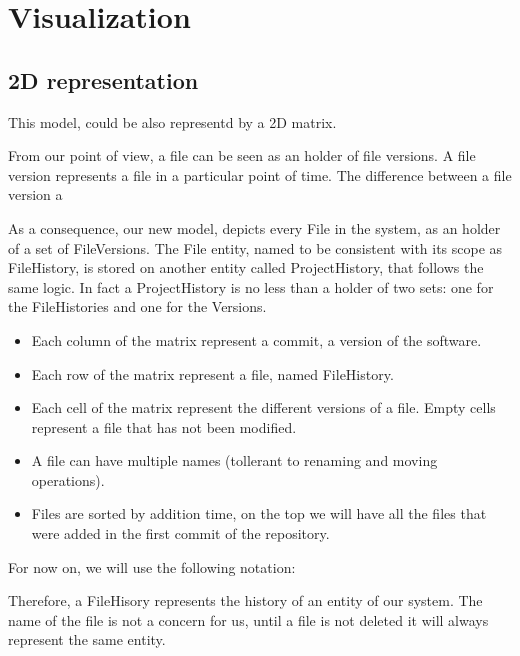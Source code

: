  



\section{Visualization}

\subsection*{2D representation}
This model, could be also representd by a 2D matrix. 


From our point of view, a file can be seen as an holder of file versions.
A file version represents a file in a particular point of time. The difference between a file version a


As a consequence, our new model, depicts every File in the system, as an holder of a set of FileVersions. 
The File entity, named to be consistent with its scope as FileHistory, is stored on another entity called ProjectHistory, that follows the same logic. 
In fact a ProjectHistory is no less than a holder of two sets: one for the FileHistories and one for the Versions. 




\begin{itemize}
    \item Each column of the matrix represent a commit, a version of the software.
    \item Each row of the matrix represent a file, named FileHistory.
    \item Each cell of the matrix represent the different versions of a file. Empty cells represent a file that has not been modified.
    \item A file can have multiple names (tollerant to renaming and moving operations).
    \item Files are sorted by addition time, on the top we will have all the files that were added in the first commit of the repository. 
\end{itemize}

For now on, we will use the following notation:


Therefore, a FileHisory represents the history of an entity of our system. 
The name of the file is not a concern for us, until a file is not deleted it will always represent the same entity. 


